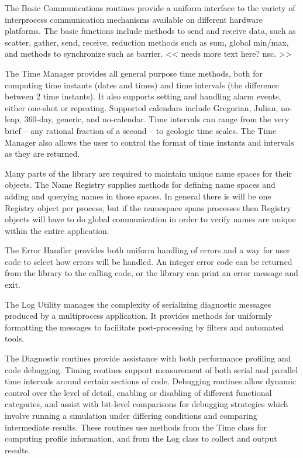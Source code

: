 The Basic Communications routines provide a uniform interface to
the variety of interprocess communication mechanisms available
on different hardware platforms.  
The basic functions include methods to send
and receive data, such as scatter, gather, send, receive,
reduction methods such as sum, global min/max, and methods
to synchronize such as barrier.
<< needs more text here?  nsc. >>

The Time Manager provides all general purpose time methods, both
for computing time instants (dates and times) and time intervals
(the difference between 2 time instants).   It also supports 
setting and handling alarm events, either one-shot or repeating.
Supported calendars include Gregorian, Julian, no-leap, 360-day, 
generic, and no-calendar.
Time intervals can range from the very brief -- any rational fraction
of a second -- to geologic time scales.
The Time Manager also allows the user to control the format of
time instants and intervals as they are returned.

Many parts of the library are required to maintain unique name
spaces for their objects.  The Name Registry supplies methods
for defining name spaces and adding and querying names in those
spaces.  In general there is will be one Registry object per
process, but if the namespace spans processes then Registry objects
will have to do global communication in order to verify names
are unique within the entire application.

The Error Handler provides both uniform handling of errors and
a way for user code to select how errors will be handled.
An integer error code can be returned from the library to the
calling code, or the library can print an error message and exit.

The Log Utility manages the complexity of serializing diagnostic
messages produced by a multiprocess application.  It provides
methods for uniformly formatting the messages to facilitate
post-processing by filters and automated tools.

The Diagnostic routines provide assistance with both performance
profiling and code debugging.  Timing routines support measurement
of both serial and parallel time intervals around certain sections
of code.  Debugging routines allow dynamic control over the level
of detail, enabling or disabling of different functional categories,
and assist with bit-level comparisons for debugging strategies which 
involve running a simulation under differing conditions and
comparing intermediate results.  These routines use methods from
the Time class for computing profile information, and from 
the Log class to collect and output results.


